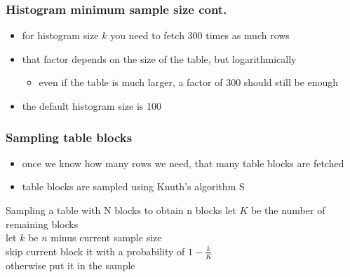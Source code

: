 \documentclass{beamer}
\begin{document}
\begin{frame}
  \frametitle{Histogram minimum sample size cont.}

  \begin{itemize}
  \item for histogram size $k$ you need to fetch \alert{300 times} as much rows
  \item that factor depends on the size of the table, but \alert{logarithmically}
    \begin{itemize}
    \item even if the table is much larger, a factor of 300 should still be enough
    \end{itemize}
  \item the default histogram size is 100
  \end{itemize}
\end{frame}

\begin{frame}
  \frametitle{Sampling table blocks}

  \begin{itemize}
  \item once we know how many rows we need, that many \alert{table blocks} are
    fetched
  \item table blocks are sampled using \alert{Knuth's algorithm S}
  \end{itemize}

  \begin{block}{Sampling a table with N blocks to obtain n blocks}
    \hspace*{2em}let $K$ be the number of remaining blocks\\
    \hspace*{2em}let $k$ be $n$ minus current sample size\\
    \hspace*{2em}skip current block it with a probability of $1 - \frac{k}{K}$\\
    \hspace*{2em}otherwise put it in the sample
  \end{block}
\end{frame}
\end{document}
